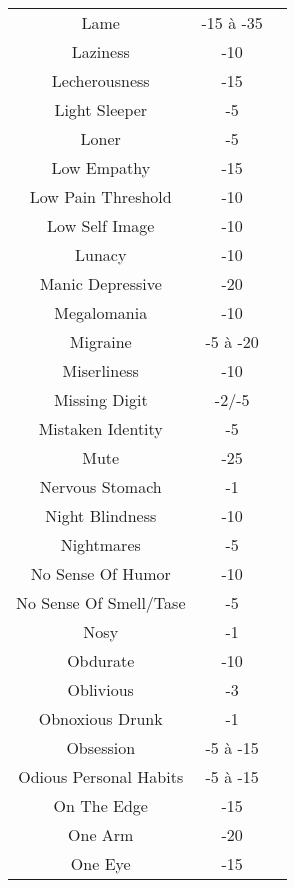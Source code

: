 \begin{center}
\begin{supertabular}{|c|c|c|}
Lame & -15 à -35 & \cite[34]{B} \\
Laziness & -10 & \cite[34]{B} \\
Lecherousness & -15 & \cite[34]{B} \\
Light Sleeper & -5 & \cite[82]{CI} \\
Loner & -5 & \cite[91]{CI} \\
Low Empathy & -15 & \cite[91]{CI} \\
Low Pain Threshold & -10 & \cite[29]{B} \\
Low Self Image & -10 & \cite[92]{CI} \\
Lunacy & -10 & \cite[92]{CI} \\
Manic Depressive & -20 & \cite[92]{CI} \\
Megalomania & -10 & \cite[34]{B} \\
Migraine & -5 à -20 & \cite[82]{CI} \\
Miserliness & -10 & \cite[34]{B} \\
Missing Digit & -2/-5 & \cite[82]{CI} \\
Mistaken Identity & -5 & \cite[78]{CI} \\
Mute & -25 & \cite[29]{B} \\
Nervous Stomach & -1 & \cite[79]{CI} \\
Night Blindness & -10 & \cite[82]{CI} \\
Nightmares & -5 & \cite[92]{CI} \\
No Sense Of Humor & -10 & \cite[92]{CI} \\
No Sense Of Smell/Tase & -5 & \cite[29]{B} \\
Nosy & -1 & \cite[92]{CI} \\
Obdurate & -10 & \cite[92]{CI} \\
Oblivious & -3 & \cite[92]{CI} \\
Obnoxious Drunk & -1 & \cite[80]{CI} \\
Obsession & -5 à -15 & \cite[93]{CI} \\
Odious Personal Habits & -5 à -15 & \cite[26]{B} \\
On The Edge & -15 & \cite[93]{CI} \\
One Arm & -20 & \cite[29]{B} \\
One Eye & -15 & \cite[29]{B} \\

\end{supertabular}
\end{center}
